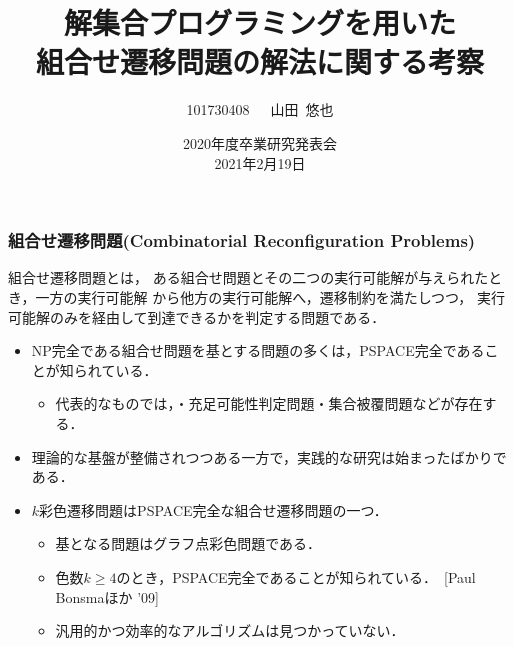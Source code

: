 \documentclass[dvipdfmx,11pt]{beamer}
\title[ASPを用いた組合せ遷移問題の解法に関する考察]{解集合プログラミングを用いた\\組合せ遷移問題の解法に関する考察}
\author{101730408~~~山田~悠也}
\date{2020年度卒業研究発表会\\2021年2月19日}
\institute{番原研究室}
\begin{document}
\begin{frame}\frametitle{}
  \titlepage
\end{frame}

\begin{frame}\frametitle{組合せ遷移問題(Combinatorial Reconfiguration Problems)}

  \begin{alertblock}{}
    組合せ遷移問題とは，
    ある組合せ問題とその二つの実行可能解が与えられたとき，一方の実行可能解
    から他方の実行可能解へ，遷移制約を満たしつつ，
    実行可能解のみを経由して到達できるかを判定する問題である．
  \end{alertblock}

  \begin{itemize}
    \item NP完全である組合せ問題を基とする問題の多くは，\alert{PSPACE完全}であることが知られている．
    \begin{itemize}
      \item 代表的なものでは，・充足可能性判定問題・集合被覆問題などが存在する．
    \end{itemize}
    \item 理論的な基盤が整備されつつある一方で，実践的な研究は始まったばかりである．
    \item \alert{$k$彩色遷移問題}はPSPACE完全な組合せ遷移問題の一つ．
    \begin{itemize}
      \item 基となる問題はグラフ点彩色問題である．
      \item 色数\alert{$k \geq 4$}のとき，PSPACE完全であることが知られている．~[Paul Bonsmaほか '09]
      \item \alert{汎用的かつ効率的なアルゴリズムは見つかっていない}．
    \end{itemize}
  \end{itemize}

\end{frame}

\end{document}

